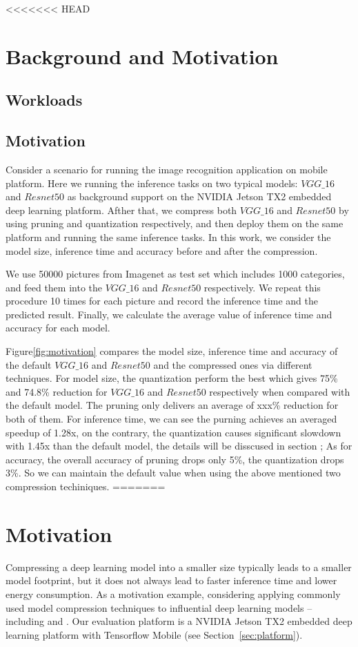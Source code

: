 <<<<<<< HEAD
\section{Background and Motivation}
\subsection{Workloads}

\subsection{Motivation}
Consider a scenario for running the image recognition application on mobile platform.
Here we running the inference tasks on
two typical models: $VGG\_16$ and $Resnet50$ as background
support on the NVIDIA Jetson TX2 embedded deep learning platform.
Afther that, we compress both $VGG\_16$ and $Resnet50$ by using pruning
and quantization respectively, and then deploy them on the same platform
and running the same inference tasks.
In this work, we consider the
model size, inference time and accuracy before and after the compression.

We use 50000 pictures from Imagenet as test set
which includes 1000 categories,
and feed them into the $VGG\_16$ and $Resnet50$ respectively.
We repeat this procedure 10 times for each picture
and record the inference time and the predicted result.
Finally, we calculate the average value of inference time and accuracy
for each model.

Figure\ref{fig:motivation} compares the model size, inference time and accuracy of the default
$VGG\_16$ and $Resnet50$ and the compressed ones via different techniques.
For model size, the quantization perform the best which gives 75\% and 74.8\%
reduction for $VGG\_16$ and $Resnet50$ respectively when compared with the default model.
The pruning only delivers an average of xxx\% reduction for both of them.
For inference time, we can see the purning achieves an averaged speedup of 1.28x,
on the contrary, the quantization causes significant slowdown with 1.45x than the default model,
the details will be disscused in section \FIXME{};
As for accuracy,  the overall accuracy of pruning drops only 5\%, the quantization drops 3\%.
So we can maintain the default value when using the above mentioned two compression techiniques.
=======

\section{Motivation}
Compressing a deep learning model into a smaller size typically leads to a smaller model footprint, but it does not always lead to faster
inference time and lower energy consumption. As a motivation example, considering applying  commonly used model compression
techniques to  influential deep learning models -- including  \CNNs and . Our evaluation platform is a
NVIDIA Jetson TX2 embedded deep learning platform with Tensorflow Mobile  (see Section~\ref{sec:platform}).

